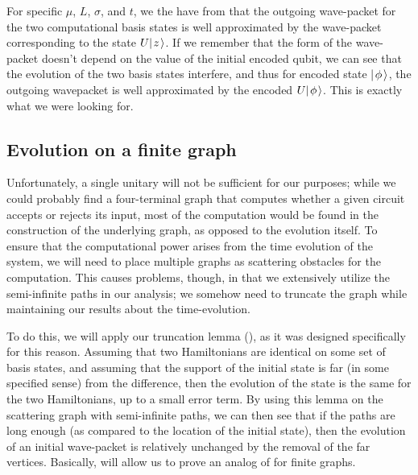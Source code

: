 \documentclass[../thesis-main/thesis-main]{subfiles}
\begin{document}
For specific $\mu$, $L$, $\sigma$, and $t$, we the have from  that the outgoing wave-packet for the two computational basis states is well approximated by the wave-packet corresponding to the state $U |\mspace{2mu} z \mspace{2mu} \rangle$.  If we remember that the form of the wave-packet doesn't depend on the value of the initial encoded qubit, we can see that the evolution of the two basis states interfere, and thus for  encoded state $|\mspace{2mu} \phi \mspace{2mu} \rangle$, the outgoing wavepacket is well approximated by the encoded $U|\mspace{2mu} \phi \mspace{2mu} \rangle$.  This is exactly what we were looking for.







\subsection{Evolution on a finite graph}\label{sec:SP_single_qubit_finite_graph}


Unfortunately, a single unitary will not be sufficient for our purposes; while we could probably find a four-terminal graph that computes whether a given circuit accepts or rejects its input, most of the computation would be found in the construction of the underlying graph, as opposed to the evolution itself.  To ensure that the computational power arises from the time evolution of the system, we will need to place multiple graphs as scattering obstacles for the computation.  This causes problems, though, in that we extensively utilize the semi-infinite paths in our analysis; we somehow need to truncate the graph while maintaining our results about the time-evolution.

To do this, we will apply our truncation lemma (), as it was designed specifically for this reason.  Assuming that two Hamiltonians are identical on some set of basis states, and assuming that the support of the initial state is far (in some specified sense) from the difference, then the evolution of the state is the same for the two Hamiltonians, up to a small error term.  By using this lemma on the scattering graph with semi-infinite paths, we can then see that if the paths are long enough (as compared to the location of the initial state), then the evolution of an initial wave-packet is relatively unchanged by the removal of the far vertices.  Basically,  will allow us to prove an analog of  for finite graphs.
\end{document}
